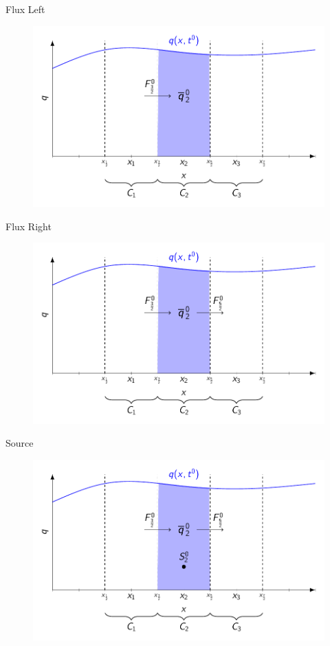 \documentclass[handout]{beamer}
\begin{document}
\begin{frame}{Flux Left}
	\begin{figure}
		\includegraphics[width=\textwidth]{./Pics/FVMpicture/TotalFluxIn.pdf}
	\end{figure}
\end{frame}
\begin{frame}{Flux Right}
	\begin{figure}
		\includegraphics[width=\textwidth]{./Pics/FVMpicture/TotalFluxInOut.pdf}
	\end{figure}
\end{frame}
\begin{frame}{Source}
	\begin{figure}
		\includegraphics[width=\textwidth]{./Pics/FVMpicture/TotalFluxInOutSource.pdf}
	\end{figure}
\end{frame}
\end{document}
